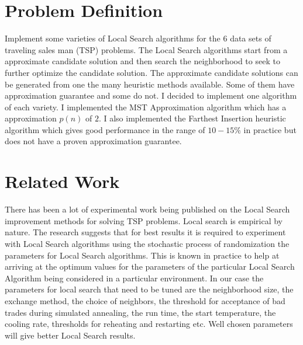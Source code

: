\documentclass[twoside,11pt]{article}
\begin{document}
\section{Problem Definition}
Implement some varieties of Local Search algorithms for the 6 data sets of traveling sales man (TSP) problems. The Local Search algorithms start from a approximate candidate solution and then search the neighborhood to seek to further optimize the candidate solution. The approximate candidate solutions can be generated from one the many heuristic methods available. Some of them have approximation guarantee and some do not. I decided to implement one algorithm of each variety. I implemented the MST Approximation algorithm which has a approximation $p(n)$ of $2$. I also implemented the Farthest Insertion heuristic algorithm which gives good performance in the range of  $10-15\%$ in practice but does not have a proven approximation guarantee.

\section{Related Work}
There has been a lot of experimental work being published on the Local Search improvement methods for solving TSP problems. Local search is empirical by nature. The research suggests that for best results it is required to experiment with Local Search algorithms using the stochastic process of randomization the parameters for Local Search algorithms. This is known in practice to help at arriving at the optimum values for the parameters of the particular Local Search Algorithm being considered in a particular environment. In our case the parameters for local search that need to be tuned are the neighborhood size, the exchange method, the choice of neighbors, the threshold for acceptance of bad trades during simulated annealing, the run time, the start temperature, the cooling rate, thresholds for reheating and restarting etc. Well chosen parameters will give better Local Search results.
\end{document}
